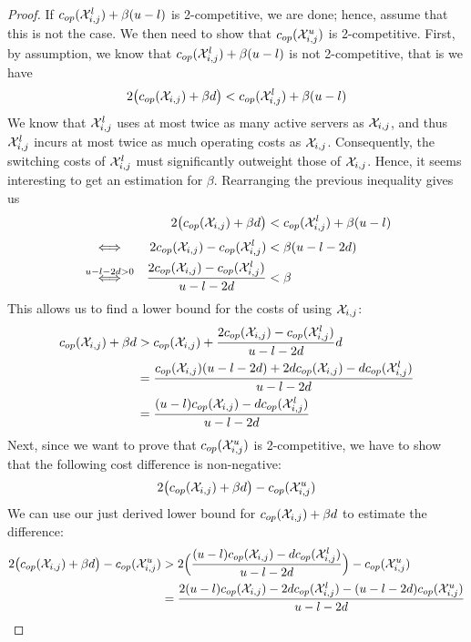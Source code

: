 \begin{proof}
If $c_{op}(\mathcal{X}_{i,j}^l)+\beta(u-l)$ is 2-competitive, we are done; hence, assume that this is not the case. We then need to show that $c_{op}(\mathcal{X}_{i,j}^u)$ is 2-competitive. First, by assumption, we know that $c_{op}(\mathcal{X}_{i,j}^l)+\beta(u-l)$ is not 2-competitive, that is we have
\begin{equation*}
	2\bigl(c_{op}(\mathcal{X}_{i,j})+\beta d\bigr)<c_{op}(\mathcal{X}_{i,j}^l)+\beta(u-l)
\end{equation*}
We know that $\mathcal{X}_{i,j}^l$ uses at most twice as many active servers as $\mathcal{X}_{i,j}$, and thus $\mathcal{X}_{i,j}^l$ incurs at most twice as much operating costs as $\mathcal{X}_{i,j}$. Consequently, the switching costs of $\mathcal{X}_{i,j}^l$ must significantly outweight those of $\mathcal{X}_{i,j}$. Hence, it seems interesting to get an estimation for $\beta$. Rearranging the previous inequality gives us
\begin{align*}
	&&2\bigl(c_{op}(\mathcal{X}_{i,j})+\beta d\bigr)&<c_{op}(\mathcal{X}_{i,j}^l)+\beta(u-l)\\
	&\stackrel{\phantom{u-l-2d>0}}{\iff}&2c_{op}(\mathcal{X}_{i,j})-c_{op}(\mathcal{X}_{i,j}^l)&<\beta(u-l-2d)\\
	&\stackrel{u-l-2d>0}{\iff}&\frac{2c_{op}(\mathcal{X}_{i,j})-c_{op}(\mathcal{X}_{i,j}^l)}{u-l-2d}&<\beta
\end{align*}
This allows us to find a lower bound for the costs of using $\mathcal{X}_{i,j}$:
\begin{align*}
	c_{op}(\mathcal{X}_{i,j})+\beta d&>c_{op}(\mathcal{X}_{i,j})+\frac{2c_{op}(\mathcal{X}_{i,j})-c_{op}(\mathcal{X}_{i,j}^l)}{u-l-2d}d\\
	&=\frac{c_{op}(\mathcal{X}_{i,j})(u-l-2d)+2dc_{op}(\mathcal{X}_{i,j})-dc_{op}(\mathcal{X}_{i,j}^l)}{u-l-2d}\\
	&=\frac{(u-l)c_{op}(\mathcal{X}_{i,j})-dc_{op}(\mathcal{X}_{i,j}^l)}{u-l-2d}
\end{align*}
Next, since we want to prove that $c_{op}(\mathcal{X}_{i,j}^u)$ is 2-competitive, we have to show that the following cost difference is non-negative:
\begin{align*}
	2\bigl(c_{op}(\mathcal{X}_{i,j})+\beta d\bigr)-c_{op}(\mathcal{X}_{i,j}^u)
\end{align*}
We can use our just derived lower bound for $c_{op}(\mathcal{X}_{i,j})+\beta d$ to estimate the difference:
\begin{align*}
	2\bigl(\opcosts(\mx_{i,j})+\beta d\bigr)-\opcosts(\mx_{i,j}^u)&>2\Bigl(\frac{(u-l)\opcosts(\mx_{i,j})-d\opcosts(\mx_{i,j}^l)}{u-l-2d}\Bigr)-\opcosts(\mx_{i,j}^u)\\
	&=\frac{2(u-l)\opcosts(\mx_{i,j})-2d\opcosts(\mx_{i,j}^l)-(u-l-2d)\opcosts(\mx_{i,j}^u)}{u-l-2d}

\end{align*}
\end{proof}
